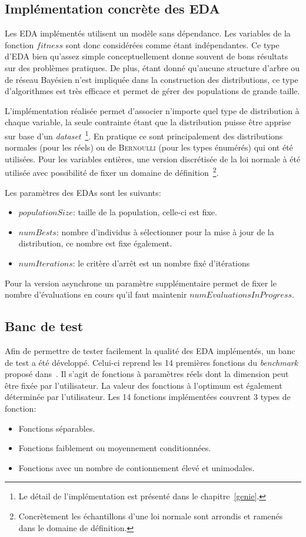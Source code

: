 \documentclass[a4paper, 11pt]{report}
\begin{document}
\subsection{Implémentation concrète des EDA}
Les EDA implémentés utilisent un modèle sans dépendance. Les variables de la fonction $fitness$ sont donc considérées comme étant indépendantes. Ce type d'EDA bien qu'assez simple conceptuellement donne souvent de bons résultats sur des problèmes pratiques. De plus, étant donné qu'aucune structure d'arbre ou de réseau Bayésien n'est impliquée dans la construction des distributions, ce type d'algorithmes est très efficace et permet de gérer des populations de grande taille.

L'implémentation réalisée permet d'associer n'importe quel type de distribution à chaque variable, la seule contrainte étant que la distribution puisse être apprise sur base d'un \textit{dataset}~\footnote{Le détail de l'implémentation est présenté dans le chapitre~\ref{genie}.}. En pratique ce sont principalement des distributions normales (pour les réels) ou de \textsc{Bernoulli} (pour les types énumérés) qui ont été utilisées. Pour les variables entières, une version discrétisée de la loi normale à été utilisée avec possibilité de fixer un domaine de définition~\footnote{Concrètement les échantillons d'une loi normale sont arrondis et ramenés dans le domaine de définition.}.

Les paramètres des EDAs sont les suivants:
\begin{itemize}
\item $populationSize$: taille de la population, celle-ci est fixe.
\item $numBests$: nombre d'individus à sélectionner pour la mise à jour de la distribution, ce nombre est fixe également.
\item $numIterations$: le critère d'arrêt est un nombre fixé d'itérations
\end{itemize}    
Pour la version asynchrone un paramètre supplémentaire permet de fixer le nombre d'évaluations en cours qu'il faut maintenir $numEvaluationsInProgress$.

\subsection{Banc de test}
Afin de permettre de tester facilement la qualité des EDA implémentés, un banc de test a été développé. Celui-ci reprend les 14 premières fonctions du \textit{benchmark} proposé dans~\cite{TESTBED}. Il s'agit de fonctions à paramètres réels dont la dimension peut être fixée par l'utilisateur. La valeur des fonctions à l'optimum est également déterminée par l'utilisateur. Les 14 fonctions implémentées couvrent 3 types de fonction:
\begin{itemize}
\item Fonctions séparables.
\item Fonctions faiblement ou moyennement conditionnées.
\item Fonctions avec un nombre de contionnement élevé et unimodales. %
\end{itemize}
\end{document}
